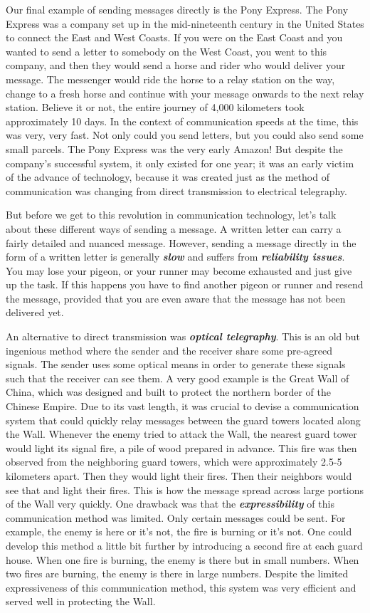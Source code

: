 Our final example of sending messages directly is the Pony Express.
The Pony Express was a company set up in the mid-nineteenth century in the United States to connect the East and West Coasts.
If you were on the East Coast and you wanted to send a letter to somebody on the West Coast, you went to this company, and then they would send a horse and rider who would deliver your message.
The messenger would ride the horse to a relay station on the way, change to a fresh horse and continue with your message onwards to the next relay station.
Believe it or not, the entire journey of 4,000 kilometers took approximately 10 days.
In the context of communication speeds at the time, this was very, very fast.
Not only could you send letters, but you could also send some small parcels.
The Pony Express was the very early Amazon!
But despite the company's successful system, it only existed for one year; it was an early victim of the advance of technology, because it was created just as the method of communication was changing from direct transmission to electrical telegraphy.

But before we get to this revolution in communication technology, let's talk about these different ways of sending a message. A written letter can carry a fairly detailed and nuanced message.
However, sending a message directly in the form of a written letter is generally \textit{\textbf{slow}} and suffers from \textit{\textbf{reliability issues}}.
You may lose your pigeon, or your runner may become exhausted and just give up the task.
If this happens you have to find another pigeon or runner and resend the message, provided that you are even aware that the message has not been delivered yet.

An alternative to direct transmission was \textit{\textbf{optical telegraphy}}.
This is an old but ingenious method where the sender and the receiver share some pre-agreed signals.
The sender uses some optical means in order to generate these signals such that the receiver can see them.
A very good example is the Great Wall of China, which was designed and built to protect the northern border of the Chinese Empire.
Due to its vast length, it was crucial to devise a communication system that could quickly relay messages between the guard towers located along the Wall.
Whenever the enemy tried to attack the Wall, the nearest guard tower would light its signal fire, a pile of wood prepared in advance. This fire was then observed from the neighboring guard towers, which were approximately 2.5-5 kilometers apart.
Then they would light their fires.
Then their neighbors would see that and light their fires.
This is how the message spread across large portions of the Wall very quickly.
One drawback was that the \textit{\textbf{expressibility}} of this communication method was limited.
Only certain messages could be sent.
For example, the enemy is here or it's not, the fire is burning or it's not.
One could develop this method a little bit further by introducing a second fire at each guard house.
When one fire is burning, the enemy is there but in small numbers.
When two fires are burning, the enemy is there in large numbers.
Despite the limited expressiveness of this communication method, this system was very efficient and served well in protecting the Wall.

